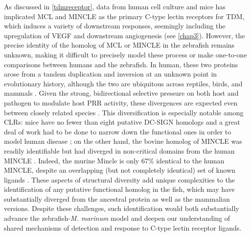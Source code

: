 As discussed in \autoref{tdmreceptor}, data from human cell culture and mice has implicated MCL and MINCLE as the primary C\hyp{}type lectin receptors for TDM, which induces a variety of downstream responses, seemingly including the upregulation of VEGF and downstream angiogenesis (see \autoref{chap3}). However, the precise identity of the homolog of MCL or MINCLE in the zebrafish remains unknown, making it difficult to precisely model these process or make one-to-one comparisons between humans and the zebrafish. In human, these two proteins arose from a tandem duplication and inversion at an unknown point in evolutionary history, although the two are ubiquitous across reptiles, birds, and mammals \citep{Miyake2013, Richardson2014}. Given the strong, bidirectional selective pressure on both host and pathogen to modulate host PRR activity, these divergences are expected even between closely related species \citep{Rambaruth2015}. This diversification is especially notable among CLRs: mice have no fewer than eight putative DC\hyp{}SIGN homologs and a great deal of work had to be done to narrow down the functional ones in order to model human disease \citep{GarciaVallejo2013}; on the other hand, the bovine homolog of MINCLE was readily identifiable but had diverged in non\hyp{}critical domains from the human MINCLE \citep{Feinberg2016, Furukawa2013, Feinberg2013}. Indeed, the murine Mincle is only 67\% identical to the human MINCLE, despite an overlapping (but not completely identical) set of known ligands \citep{Matsumoto1999}. These aspects of structural diversity add unique complexities to the identification of any putative functional homolog in the fish, which may have substantially diverged from the ancestral protein as well as the mammalian versions. Despite these challenges, such identification would both substantially advance the zebrafish\hyp{}\textit{M. marinum} model and deepen our understanding of shared mechanisms of detection and response to C\hyp{}type lectin receptor ligands.


